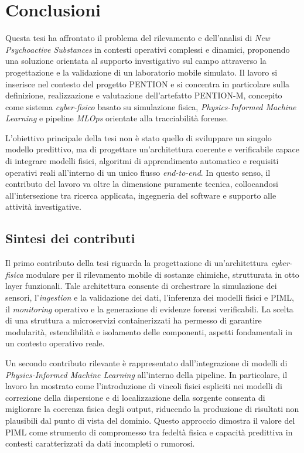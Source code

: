 
\chapter{Conclusioni}
\label{chap:conclusions}

Questa tesi ha affrontato il problema del rilevamento e dell’analisi di \textit{New Psychoactive Substances} in contesti operativi complessi e dinamici, proponendo una soluzione orientata al supporto investigativo sul campo attraverso la progettazione e la validazione di un laboratorio mobile simulato.
Il lavoro si inserisce nel contesto del progetto \textsc{PENTION} e si concentra in particolare sulla definizione, realizzazione e valutazione dell’artefatto \textsc{PENTION-M}, concepito come sistema \textit{cyber-fisico} basato su simulazione fisica, \textit{Physics-Informed Machine Learning} e pipeline \textit{MLOps} orientate alla tracciabilità forense.

L’obiettivo principale della tesi non è stato quello di sviluppare un singolo modello predittivo, ma di progettare un’architettura coerente e verificabile capace di integrare modelli fisici, algoritmi di apprendimento automatico e requisiti operativi reali all’interno di un unico flusso \textit{end-to-end}.
In questo senso, il contributo del lavoro va oltre la dimensione puramente tecnica, collocandosi all’intersezione tra ricerca applicata, ingegneria del software e supporto alle attività investigative.

\section{Sintesi dei contributi}

Il primo contributo della tesi riguarda la progettazione di un’architettura \textit{cyber-fisica} modulare per il rilevamento mobile di sostanze chimiche, strutturata in otto layer funzionali.
Tale architettura consente di orchestrare la simulazione dei sensori, l’\textit{ingestion} e la validazione dei dati, l’inferenza dei modelli fisici e PIML, il \textit{monitoring} operativo e la generazione di evidenze forensi verificabili.
La scelta di una struttura a microservizi containerizzati ha permesso di garantire modularità, estendibilità e isolamento delle componenti, aspetti fondamentali in un contesto operativo reale.

Un secondo contributo rilevante è rappresentato dall’integrazione di modelli di \textit{Physics-Informed Machine Learning} all’interno della pipeline.
In particolare, il lavoro ha mostrato come l’introduzione di vincoli fisici espliciti nei modelli di correzione della dispersione e di localizzazione della sorgente consenta di migliorare la coerenza fisica degli output, riducendo la produzione di risultati non plausibili dal punto di vista del dominio.
Questo approccio dimostra il valore del PIML come strumento di compromesso tra fedeltà fisica e capacità predittiva in contesti caratterizzati da dati incompleti o rumorosi.


